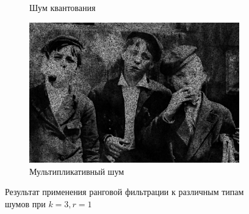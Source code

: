 \begin{figure}[ht]
\begin{subfigure}[b]{0.5\linewidth}
      \caption{Шум квантования} 
      \label{rang_3_1:e}
    \end{subfigure}%
    \begin{subfigure}[b]{0.5\linewidth}
        \centering
        \includegraphics[width=0.95\linewidth]{../Rang_Filter/Rang_Speckle_noise_(k=3,r=1).jpg} 
        \caption{Мультипликативный шум} 
        \label{rang_3_1:f} 
    \end{subfigure} 
    \caption{Результат применения ранговой фильтрации к различным типам шумов при $k = 3, r = 1$}
    \label{img:rang_3_1} 
\end{figure}

